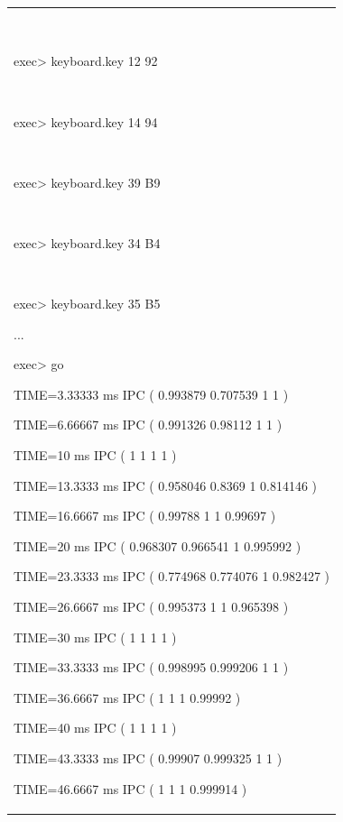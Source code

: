 \documentclass[a4paper]{article}
\begin{document}
\begin{flushleft}
\begin{tiny}
\begin{supertabular}{|m{6.34626in}|}
~

{ exec{\textgreater}
keyboard.key 12 92}

~

{ exec{\textgreater}
keyboard.key 14 94}

~

{ exec{\textgreater}
keyboard.key 39 B9}

~

{ exec{\textgreater}
keyboard.key 34 B4}

~

{ exec{\textgreater}
keyboard.key 35 B5}

{\ttfamily ...}

{ exec{\textgreater} go}

{\ttfamily TIME=3.33333 ms IPC (
0.993879 0.707539 1 1 )}

{\ttfamily TIME=6.66667 ms IPC (
0.991326 0.98112 1 1 )}

{\ttfamily TIME=10 ms IPC ( 1 1 1 1
)}

{\ttfamily TIME=13.3333 ms IPC (
0.958046 0.8369 1 0.814146 )}

{\ttfamily TIME=16.6667 ms IPC (
0.99788 1 1 0.99697 )}

{\ttfamily TIME=20 ms IPC (
0.968307 0.966541 1 0.995992 )}

{\ttfamily TIME=23.3333 ms IPC (
0.774968 0.774076 1 0.982427 )}

{\ttfamily TIME=26.6667 ms IPC (
0.995373 1 1 0.965398 )}

{\ttfamily TIME=30 ms IPC ( 1 1 1 1
)}

{\ttfamily TIME=33.3333 ms IPC (
0.998995 0.999206 1 1 )}

{\ttfamily TIME=36.6667 ms IPC ( 1
1 1 0.99992 )}

{\ttfamily TIME=40 ms IPC ( 1 1 1 1
)}

{\ttfamily TIME=43.3333 ms IPC (
0.99907 0.999325 1 1 )}

{\ttfamily TIME=46.6667 ms IPC ( 1
1 1 0.999914 )}


\end{supertabular}
\end{tiny}
\end{flushleft}
\end{document}
